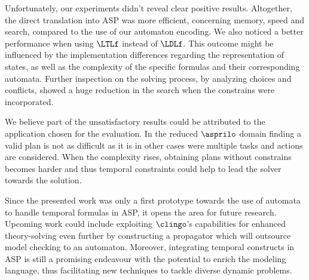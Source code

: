 Unfortunately, our experiments didn't reveal clear positive results. 
Altogether, the direct translation into ASP was more efficient, concerning memory, speed and search, compared to the use of our automaton encoding. 
We also noticed a better performance when using $\LTLf$ instead of $\LDLf$. 
This outcome might be influenced by the implementation differences regarding the representation of states, as well as the complexity of the specific formulas and their corresponding automata.
Further inspection on the solving process, by analyzing choices and conflicts, showed a huge reduction in the search when the constrains were incorporated. 

We believe part of the unsatisfactory results could be attributed to the application chosen for the evaluation. 
In the reduced $\asprilo$ domain finding a valid plan is not as difficult as it is in other cases were multiple tasks and actions are considered. 
When the complexity rises, obtaining plans without constrains becomes harder and thus temporal constraints could help to lead the solver towards the solution. 

Since the presented work was only a first prototype towards the use of automata to handle temporal formulas in ASP, it opens the area for future research.
Upcoming work could include exploiting $\clingo$'s capabilities for enhanced theory-solving even further by constructing a propagator which will outsource model checking to an automaton. 
Moreover, integrating temporal constructs in ASP is still a promising endeavour with the potential to enrich the modeling language, thus facilitating new techniques to tackle diverse dynamic problems.

\pgfplotsset{compat=newest}

